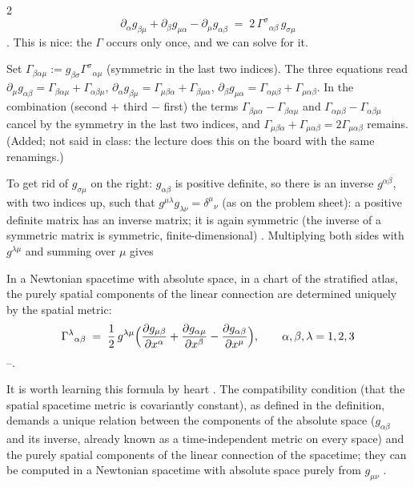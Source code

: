 \begin{paracol}{2}
\[
  \partial_\alpha g_{\beta\mu}+\partial_\beta g_{\mu\alpha}-\partial_\mu g_{\alpha\beta}\;=\;2\,\Gamma^\sigma{}_{\alpha\beta}\,g_{\sigma\mu}
\]
. This is nice: the $\Gamma$ occurs only once, and we can solve for it.
\begin{coursenote}
Set $\Gamma_{\beta\alpha\mu}:=g_{\beta\sigma}\Gamma^\sigma{}_{\alpha\mu}$ (symmetric in the last two indices). The three equations read
$\partial_\mu g_{\alpha\beta}=\Gamma_{\beta\alpha\mu}+\Gamma_{\alpha\beta\mu}$, $\partial_\alpha g_{\beta\mu}=\Gamma_{\mu\beta\alpha}+\Gamma_{\beta\mu\alpha}$,
$\partial_\beta g_{\mu\alpha}=\Gamma_{\alpha\mu\beta}+\Gamma_{\mu\alpha\beta}$. In the combination (second $+$ third $-$ first) the terms $\Gamma_{\beta\mu\alpha}-\Gamma_{\beta\alpha\mu}$ and $\Gamma_{\alpha\mu\beta}-\Gamma_{\alpha\beta\mu}$ cancel by the symmetry in the
last two indices, and $\Gamma_{\mu\beta\alpha}+\Gamma_{\mu\alpha\beta}=2\Gamma_{\mu\alpha\beta}$ remains. (Added; not said in class: the lecture does this on the board with the same renamings.)
\end{coursenote}
To get rid of $g_{\sigma\mu}$ on the right: $g_{\alpha\beta}$ is positive definite, so there is an inverse $g^{\alpha\beta}$, with two indices up, such that $g^{\mu\lambda}g_{\lambda\nu}=\delta^\mu{}_\nu$ (as on the problem sheet): a positive definite matrix has an inverse matrix; it is again symmetric
(the inverse of a symmetric matrix is symmetric, finite-dimensional) . Multiplying both sides with $g^{\lambda\mu}$ and summing over $\mu$ gives
\begin{theorem}\label{thm:as-christoffel}
In a Newtonian spacetime with absolute space, in a chart of the stratified atlas, the purely spatial components of the linear connection are determined uniquely by the spatial metric:
\begin{equation}\label{eq:as-christoffel}
  \Gamma^\lambda{}_{\alpha\beta}\;=\;\frac12\,g^{\lambda\mu}\Bigl(\frac{\partial g_{\mu\beta}}{\partial x^\alpha}+\frac{\partial g_{\alpha\mu}}{\partial x^\beta}-\frac{\partial g_{\alpha\beta}}{\partial x^\mu}\Bigr),\qquad\alpha,\beta,\lambda=1,2,3
\end{equation}
--.
\end{theorem}
It is worth learning this formula by heart . The compatibility condition (that the spatial spacetime metric is covariantly constant), as defined in the definition, demands a unique relation between the components of the absolute space ($g_{\alpha\beta}$ and its inverse, already known as a
time-independent metric on every space) and the purely spatial components of the linear connection of the spacetime; they can be computed in a Newtonian spacetime with absolute space purely from $g_{\mu\nu}$ .


\end{paracol}

